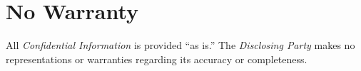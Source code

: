 
\section{No Warranty}
\label{sec:warranty}

All \textit{Confidential Information} is provided “as is.” The \textit{Disclosing Party} makes no representations or warranties regarding its accuracy or completeness.

